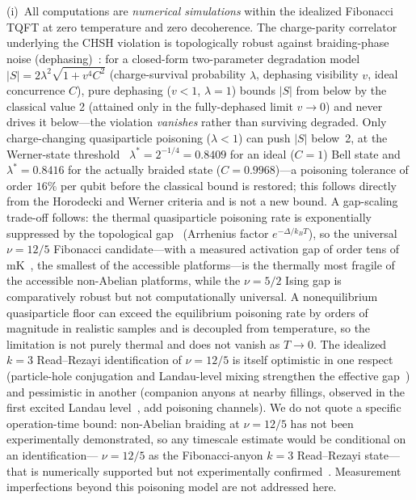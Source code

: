 \documentclass[aps,pra,twocolumn,superscriptaddress,longbibliography,floatfix,nofootinbib]{revtex4-2}
\begin{document}
(i)~All computations are \emph{numerical simulations} within the
idealized Fibonacci TQFT at zero temperature and zero decoherence.
The charge-parity correlator underlying the CHSH violation is
topologically robust against braiding-phase noise
(dephasing)~\cite{Nayak2008}: for a closed-form two-parameter
degradation model $|S| = 2\lambda^2\sqrt{1+v^4 C^2}$ (charge-survival
probability $\lambda$, dephasing visibility $v$, ideal concurrence
$C$), pure dephasing ($v<1$, $\lambda=1$) bounds $|S|$ from below by
the classical value 2 (attained only in the fully-dephased limit
$v\to0$) and never drives it below---the violation \emph{vanishes}
rather than surviving degraded. Only charge-changing quasiparticle poisoning ($\lambda<1$)
can push $|S|$ below~2, at the Werner-state
threshold~\cite{Horodecki1995} $\lambda^\ast=2^{-1/4}=0.8409$ for an
ideal ($C=1$) Bell state and $\lambda^\ast=0.8416$ for the actually
braided state ($C=0.9968$)---a poisoning tolerance of order $16\%$
per qubit before the classical bound is restored; this follows
directly from the Horodecki and Werner criteria and is not a new
bound. A gap-scaling trade-off follows: the thermal quasiparticle
poisoning rate is exponentially suppressed by the topological
gap~\cite{KarzigColePikulin2021} (Arrhenius factor
$e^{-\Delta/k_BT}$), so the universal $\nu=12/5$
Fibonacci candidate---with a measured activation gap of order tens
of mK~\cite{Zhang2012}, the smallest of the accessible platforms---is
the thermally most fragile of the
accessible non-Abelian platforms,
while the $\nu=5/2$ Ising gap is comparatively robust but not
computationally universal. A nonequilibrium quasiparticle floor can
exceed the equilibrium poisoning rate by orders of magnitude in
realistic samples and is decoupled from temperature, so the
limitation is not purely thermal and does not vanish as $T\to 0$.
The idealized $k=3$ Read--Rezayi identification of $\nu=12/5$ is
itself optimistic in one respect (particle-hole conjugation and
Landau-level mixing strengthen the effective
gap~\cite{Mong2017}) and pessimistic in another (companion anyons at
nearby fillings, observed in the first excited Landau
level~\cite{Pan2008}, add poisoning channels). We do not
quote a specific operation-time bound: non-Abelian braiding at
$\nu=12/5$ has not been experimentally demonstrated, so any
timescale estimate would be conditional on an identification---
$\nu=12/5$ as the Fibonacci-anyon $k=3$ Read--Rezayi
state---that is numerically supported but not experimentally
confirmed~\cite{Mong2017,Zhu2015,Pakrouski2016}. Measurement
imperfections beyond this poisoning model are not addressed here.
\end{document}
